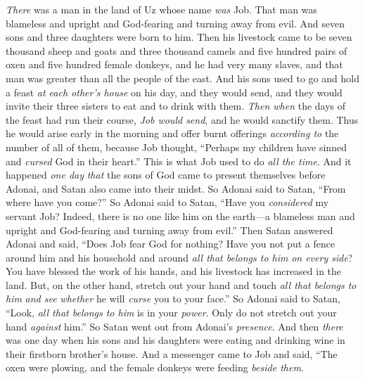 
\begin{biblechapter} %
 \textit{There} was a man in the land of Uz whose name \textit{was} Job. That man was blameless and upright and God-fearing and turning away from evil.
\verse And seven sons and three daughters were born to him.
\verse Then his livestock came to be seven thousand sheep and goats and three thousand camels and five hundred pairs of oxen and five hundred female donkeys, and he had very many slaves, and that man was greater than all the people of the east.
\verse And his sons used to go and hold a feast \textit{at each other’s house} on his day, and they would send, and they would invite their three sisters to eat and to drink with them.
\verse \textit{Then when} the days of the feast had run their course, \textit{Job would send}, and he would sanctify them. Thus he would arise early in the morning and offer burnt offerings \textit{according to} the number of all of them, because Job thought, “Perhaps my children have sinned and \textit{cursed} God in their heart.” This is what Job used to do \textit{all the time}.
\verse And it happened \textit{one day} \textit{that} the sons of God came to present themselves before Adonai, and Satan also came into their midst.
\verse So Adonai said to Satan, “From where have you come?”
\verse So Adonai said to Satan, “Have you \textit{considered} my servant Job? Indeed, there is no one like him on the earth—a blameless man and upright and God-fearing and turning away from evil.”
\verse Then Satan answered Adonai and said, “Does Job fear God for nothing?
\verse Have you not put a fence around him and his household and around \textit{all that belongs to him} \textit{on every side}? You have blessed the work of his hands, and his livestock has increased in the land.
\verse But, on the other hand, stretch out your hand and touch \textit{all that belongs to him} \textit{and see} \textit{whether} he will \textit{curse} you to your face.”
\verse So Adonai said to Satan, “Look, \textit{all that belongs to him} is in your \textit{power}. Only do not stretch out your hand \textit{against} him.” So Satan went out from Adonai’s \textit{presence}.
 And then \textit{there} was one day when his sons and his daughters were eating and drinking wine in their firstborn brother’s house.
\verse And a messenger came to Job and said, “The oxen were plowing, and the female donkeys were feeding \textit{beside them}.

\end{biblechapter}
